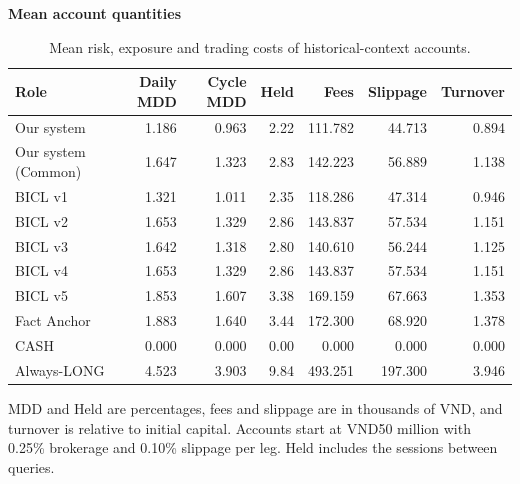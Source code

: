 \begin{table}[htb]
\centering\small
\setlength{\tabcolsep}{3pt}
\renewcommand{\arraystretch}{1.12}
\caption{Mean risk, exposure and trading costs of historical-context accounts.}
\label{tab:u09-economics}
\textbf{Mean account quantities}\par\smallskip
\begin{tabular}{lrrrrrr}
\hline
Role & Daily MDD & Cycle MDD & Held & Fees & Slippage & Turnover \\
\hline
Our system & 1.186 & 0.963 & 2.22 & 111.782 & 44.713 & 0.894 \\
Our system (Common) & 1.647 & 1.323 & 2.83 & 142.223 & 56.889 & 1.138 \\
BICL v1 & 1.321 & 1.011 & 2.35 & 118.286 & 47.314 & 0.946 \\
BICL v2 & 1.653 & 1.329 & 2.86 & 143.837 & 57.534 & 1.151 \\
BICL v3 & 1.642 & 1.318 & 2.80 & 140.610 & 56.244 & 1.125 \\
BICL v4 & 1.653 & 1.329 & 2.86 & 143.837 & 57.534 & 1.151 \\
BICL v5 & 1.853 & 1.607 & 3.38 & 169.159 & 67.663 & 1.353 \\
Fact Anchor & 1.883 & 1.640 & 3.44 & 172.300 & 68.920 & 1.378 \\
CASH & 0.000 & 0.000 & 0.00 & 0.000 & 0.000 & 0.000 \\
Always-LONG & 4.523 & 3.903 & 9.84 & 493.251 & 197.300 & 3.946 \\
\hline
\end{tabular}\par\medskip
\begin{minipage}{\textwidth}\footnotesize MDD and Held are percentages, fees and slippage are in thousands of VND, and turnover is relative to initial capital. Accounts start at VND50 million with 0.25\% brokerage and 0.10\% slippage per leg. Held includes the sessions between queries.\end{minipage}
\end{table}
